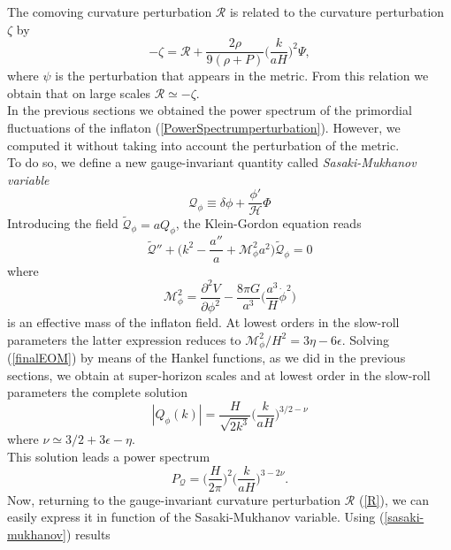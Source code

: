 \documentclass[11pt,a4paper,twoside]{book}
\begin{document}
The comoving curvature perturbation $\mathcal{R}$ is related to the curvature perturbation $\zeta$ by
\begin{equation}
	- \zeta = \mathcal{R} + \frac{2\rho}{9(\rho + P)} \Big (\frac{k}{aH}\Big)^{2}\Psi,
\end{equation}
where $\psi$ is the perturbation that appears in the metric. 
From this relation we obtain that on large scales $\mathcal{R} \simeq -\zeta$.\\
In the previous sections we obtained the power spectrum of  the primordial fluctuations of the inflaton (\ref{PowerSpectrumperturbation}). However, we computed it without taking into account the perturbation of the metric.\\
To do so, we define a new gauge-invariant quantity called  \textit{Sasaki-Mukhanov variable}
\begin{equation}
	\label{sasaki-mukhanov}
	\mathcal{Q}_{\phi} \equiv \delta \phi + \frac{\phi'}{\mathcal{H}}\Phi 
\end{equation}
Introducing the field $\tilde{\mathcal{Q}}_{\phi}=aQ_{\phi}$, the Klein-Gordon equation reads \cite{NonGauss:Intro}
\begin{equation}
	\label{finalEOM}
\tilde{\mathcal{Q}}'' + \Big (k^{2} - \frac{a''}{a} + \mathcal{M}_{\phi}^{2}a^{2}\Big)\tilde{\mathcal{Q}}_{\phi} = 0
\end{equation} 
where 
\begin{equation}
 \mathcal{M}^{2}_{\phi}=\frac{\partial^{2} V}{\partial \phi^{2}} - \frac{8\pi G}{a^{3}}\Big (\frac{a^{3}}{H}\dot{\phi}^{2}\Big)
\end{equation}
is an effective mass of the inflaton field. At lowest orders in the slow-roll parameters the latter expression reduces to $ \mathcal{M}^{2}_{\phi}/H^{2} = 3\eta-6\epsilon $. Solving (\ref{finalEOM}) by means of the Hankel functions, as we did in the previous sections, we obtain at super-horizon scales and at  lowest order in the slow-roll parameters the complete solution
\begin{equation}
	\label{solutionPerturbation}
	|Q_{\phi}(k)| = \frac{H}{\sqrt{2k^{3}}}\Big (\frac{k}{aH}\Big)^{3/2-\nu}
\end{equation}
where $ \nu \simeq 3/2 + 3\epsilon - \eta $.\\
This solution leads a power spectrum
\begin{equation}
\label{PSQ}
P_{\mathcal{Q}}=\Big (\frac{H}{2\pi} \Big)^{2}\Big(\frac{k}{aH}\Big)^{3-2\nu}.
\end{equation}
Now, returning to the gauge-invariant curvature perturbation $ \mathcal{R} $ (\ref{R}), we can easily express it in function of the Sasaki-Mukhanov variable. Using (\ref{sasaki-mukhanov}) results
\end{document}
